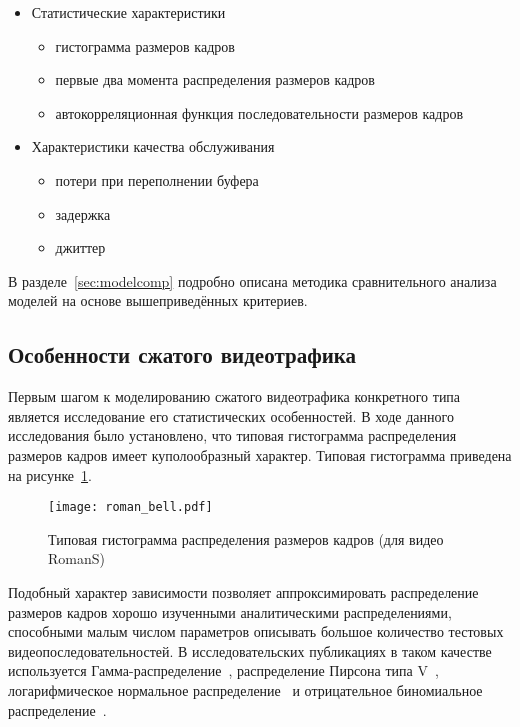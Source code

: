 \begin{itemize}
    \item Статистические характеристики
        \begin{itemize}
            \item гистограмма размеров кадров
            \item первые два момента распределения размеров кадров
            \item автокорреляционная функция последовательности размеров кадров
        \end{itemize}

    \item Характеристики качества обслуживания
        \begin{itemize}
            \item потери при переполнении буфера
            \item задержка
            \item джиттер
        \end{itemize}
\end{itemize}

В разделе~\ref{sec:modelcomp} подробно описана
методика сравнительного анализа моделей на основе
вышеприведённых критериев.

\subsection{Особенности сжатого видеотрафика}
\label{sse:traces}

Первым шагом к моделированию сжатого видеотрафика конкретного
типа является исследование его статистических особенностей.
В ходе данного исследования было установлено, что типовая
гистограмма распределения размеров кадров имеет
куполообразный характер. Типовая гистограмма приведена на
рисунке~\ref{fig:romanbell}.

\begin{figure}[h]
    \begin{center}
        \texttt{[image: roman\_bell.pdf]}
    \end{center}
    \caption{Типовая гистограмма распределения размеров кадров (для видео RomanS)}
    \label{fig:romanbell}
\end{figure}

Подобный характер зависимости позволяет аппроксимировать
распределение размеров кадров хорошо изученными аналитическими
распределениями, способными малым числом параметров описывать
большое количество тестовых видеопоследовательностей.
В исследовательских публикациях в таком качестве используется
Гамма-распределение~\cite{heymansourcemodels},
распределение Пирсона типа V~\cite{lazarismodelling},
логарифмическое нормальное распределение~\cite{Krunz95atraffic} и
отрицательное биномиальное распределение~\cite{heymanATM}.

